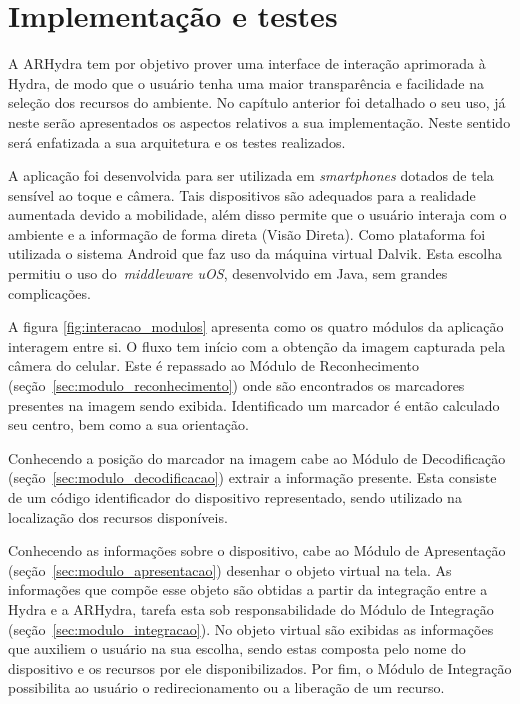\chapter{Implementação e testes}
\label{cap:implementacao_testes}



	A ARHydra tem por objetivo prover uma interface de interação aprimorada à Hydra, de modo que o
	usuário tenha uma maior transparência e facilidade na seleção dos recursos do ambiente. No capítulo
	anterior foi detalhado o seu uso, já neste serão apresentados os aspectos relativos a sua
	implementação. Neste sentido será enfatizada a sua arquitetura e os testes realizados.
	
	A aplicação foi desenvolvida para ser utilizada em \textit{smartphones} dotados de tela sensível ao toque e câmera.
	Tais dispositivos são adequados para a realidade aumentada devido a mobilidade, além disso permite 
	que o usuário interaja com o ambiente e a informação de forma direta (Visão Direta). Como
	plataforma foi utilizada o sistema Android que faz uso da máquina virtual Dalvik. Esta escolha
	permitiu o uso do~\textit{middleware uOS}, desenvolvido em Java, sem grandes complicações.

 	A figura \ref{fig:interacao_modulos} apresenta como os quatro módulos da aplicação interagem entre
 	si. O fluxo tem início com a obtenção da imagem capturada pela câmera do celular. Este é repassado
 	ao Módulo de Reconhecimento (seção~\ref{sec:modulo_reconhecimento}) onde são encontrados os
 	marcadores presentes na imagem sendo exibida. Identificado um marcador é então calculado seu
 	centro, bem como a sua orientação.
 	
	Conhecendo a posição do marcador na imagem cabe ao Módulo de Decodificação
	(seção~\ref{sec:modulo_decodificacao}) extrair a informação presente. Esta consiste de um código
	identificador do dispositivo representado, sendo utilizado na localização dos recursos
	disponíveis.
	
	Conhecendo as informações sobre o dispositivo, cabe ao Módulo de Apresentação
	(seção~\ref{sec:modulo_apresentacao}) desenhar o objeto virtual na tela. As informações que compõe
	esse objeto são obtidas a partir da integração entre a Hydra e a ARHydra, tarefa esta sob
	responsabilidade do Módulo de Integração (seção~\ref{sec:modulo_integracao}). No objeto virtual são
	exibidas as informações que auxiliem o usuário na sua escolha, sendo estas composta pelo nome do
	dispositivo e os recursos por ele disponibilizados. Por fim, o Módulo de Integração possibilita ao
	usuário o redirecionamento ou a liberação de um recurso.
	
